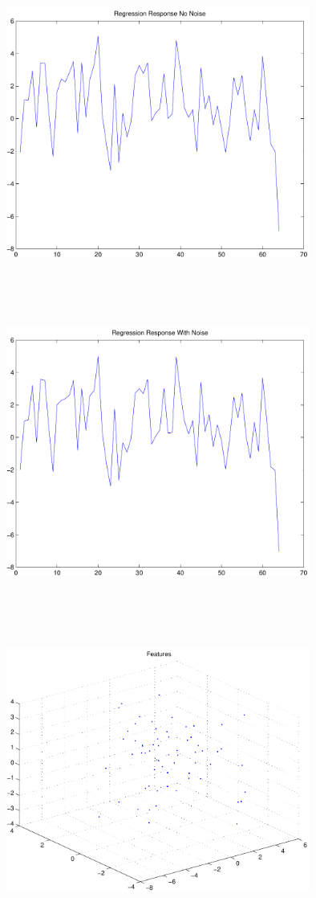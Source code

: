 \documentclass[9pt]{article}
\theoremstyle{plain}
\theoremstyle{definition}
\theoremstyle{remark}
\numberwithin{equation}{section}
\begin{document}
\includegraphics[width=10.0cm,height=10.0cm]{regression_response_no_noise.pdf}

\includegraphics[width=10.0cm,height=10.0cm]{regression_response_with_noise.pdf}

\includegraphics[width=10.0cm,height=10.0cm]{regression_features.pdf}
\end{document}
